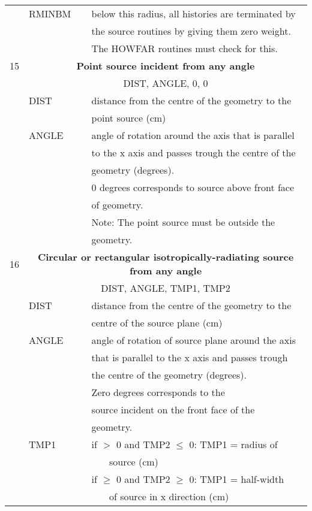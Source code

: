 \begin{longtable}{lll}
  & RMINBM  &  below this radius, all histories are terminated by\\
  &         &  the source routines by giving them zero weight. \\
  &         &  The HOWFAR routines must check for this.\\
\hline
15&\multicolumn{2}{c}{\bf Point source incident from any angle}\\
  &\multicolumn{2}{c}{DIST, ANGLE, 0, 0}\\
  & DIST    &  distance from the centre of the geometry to the\\
  &         &  point source (cm)\\
  & ANGLE   &  angle of rotation around the axis that is parallel \\
  &         &  to the x axis and passes trough the centre of the \\
  &         &  geometry (degrees).\\
  &         &  0 degrees corresponds to source above front face\\
  &         &  of geometry.\\
  &         &  Note: The point source must be outside the\\
  &         &  geometry.\\
\hline
16&\multicolumn{2}{c}{\bf Circular or rectangular isotropically-radiating source from any angle}\\
  &\multicolumn{2}{c}{DIST, ANGLE, TMP1, TMP2}\\
  & DIST    & distance from the centre of the geometry to the\\
  &         & centre of the source plane (cm)\\
  & ANGLE   & angle of rotation of source plane around the axis \\
  &         & that is parallel to the x axis and passes trough \\
  &         & the centre of the geometry (degrees). \\
  &         & Zero degrees corresponds to the\\
  &         & source incident on the front face of the\\
  &         & geometry.\\
  & TMP1    & if $>$ 0 and TMP2 $\leq$ 0: TMP1 = radius of\\
  &         & ~~~ source (cm)\\
  &         & if $\geq$ 0 and TMP2 $\geq$ 0: TMP1 = half-width\\
  &         & ~~~ of source in x direction (cm)\\

\end{longtable}
